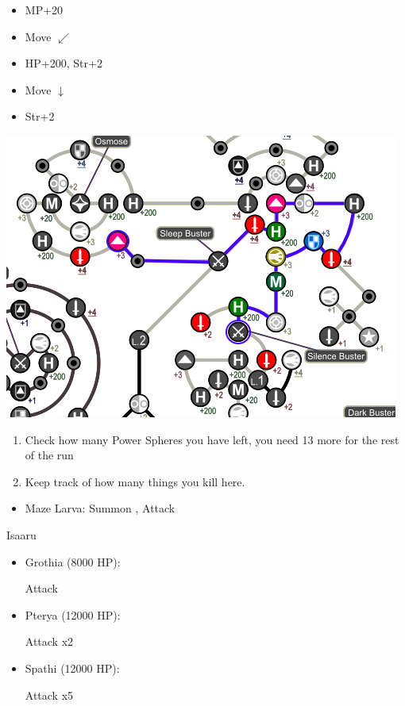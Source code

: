 \begin{spheregrid}
\begin{itemize}
\begin{itemize}
      \item MP+20
      \item Move $\swarrow$
      \item HP+200, Str+2
      \item Move $\downarrow$
      \item Str+2
    \end{itemize}
    \includegraphics[width=.8\columnwidth]{graphics/Yuna_Via_Purifico}
  \end{itemize}
\end{spheregrid}
\begin{enumerate}[resume]
  \item Check how many Power Spheres you have left, you need 13 more for the rest of the run
  \item Keep track of how many things you kill here.
\end{enumerate}
\begin{encounters}
  \begin{itemize}
    \item Maze Larva: Summon \ixilon, Attack
  \end{itemize}
\end{encounters}
\vfill
\begin{battle}{Isaaru}
  \begin{itemize}
    \item Grothia (8000 HP):
          \begin{itemize}
            \summon{\bahamut}
            \bahamutf Attack
          \end{itemize}
    \item Pterya (12000 HP):
          \begin{itemize}
            \summon{\bahamut}
            \bahamutf Attack x2
          \end{itemize}
    \item Spathi (12000 HP):
          \begin{itemize}
            \summon{\ixilon}
            \ixilonf Attack x5
          \end{itemize}
  \end{itemize}
\end{battle}
